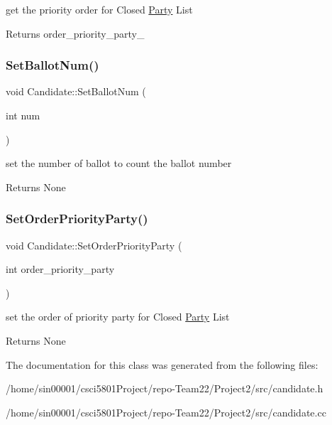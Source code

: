 get the priority order for Closed \hyperlink{classParty}{Party} List 

\begin{DoxyReturn}{Returns}
order\+\_\+priority\+\_\+party\+\_\+ 
\end{DoxyReturn}
\mbox{\label{classCandidate_a0cfc3de32eb64ec8c6f871120f3e971d}} 
\subsubsection{\texorpdfstring{Set\+Ballot\+Num()}{SetBallotNum()}}
{\footnotesize\ttfamily void Candidate\+::\+Set\+Ballot\+Num (\begin{DoxyParamCaption}\item[{int}]{num }\end{DoxyParamCaption})}



set the number of ballot to count the ballot number 

\begin{DoxyReturn}{Returns}
None 
\end{DoxyReturn}
\mbox{\label{classCandidate_a7007f43ce1b34fa18e382708b65b3505}} 
\subsubsection{\texorpdfstring{Set\+Order\+Priority\+Party()}{SetOrderPriorityParty()}}
{\footnotesize\ttfamily void Candidate\+::\+Set\+Order\+Priority\+Party (\begin{DoxyParamCaption}\item[{int}]{order\+\_\+priority\+\_\+party }\end{DoxyParamCaption})}



set the order of priority party for Closed \hyperlink{classParty}{Party} List 

\begin{DoxyReturn}{Returns}
None 
\end{DoxyReturn}


The documentation for this class was generated from the following files\+:\begin{DoxyCompactItemize}
\item 
/home/sin00001/csci5801\+Project/repo-\/\+Team22/\+Project2/src/candidate.\+h\item 
/home/sin00001/csci5801\+Project/repo-\/\+Team22/\+Project2/src/candidate.\+cc\end{DoxyCompactItemize}
